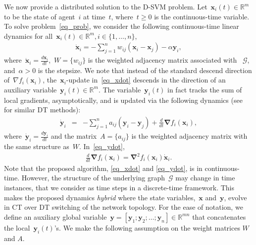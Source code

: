 \documentclass[letterpaper, 10pt, conference]{ieeeconf}
\def\mb{\mathbf}
\def\mbb{\mathbb}
\def\mc{\mathcal}
\begin{document}
We now provide a distributed solution to  the D-SVM problem. 
Let~$\mb{x}_i(t)\in\mathbb R^m$ to be the state of agent~$i$ at time~$t$, where~$t\geq 0$ is the continuous-time variable. To solve problem~\eqref{eq_prob}, we consider the following continuous-time linear dynamics for all~$\mb{x}_i(t) \in \mathbb{R}^{m},i\in\{1,\ldots,n\}$, 
\begin{eqnarray} \label{eq_xdot}	 
	\dot{\mb{x}}_i = -\sum_{j=1}^{n} w_{ij}(\mb{x}_i-\mb{x}_j)-\alpha \mb{y}_i, 
\end{eqnarray}
where~${\dot{\mb{x}}_i=\frac{d{\mb{x}}_i}{dt}}$,~${W=\{w_{ij}\}}$ is the weighted adjacency matrix associated with ~$\mc{G}$, and~$\alpha>0$ is the stepsize.  We note that instead of the standard descend direction of~$\nabla f_i(\mathbf{x}_i)$, the~$\mathbf{x}_i$-update in~\eqref{eq_xdot}
descends in the direction of an auxiliary variable~$\mb y_i(t)\in\mathbb{R}^m$. The variable~$\mb y_i(t)$ in fact tracks the sum of local gradients, asymptotically, and is updated via the following dynamics (see~\cite{xin2020decentralized,xin2020general,giannakis2020time} for similar DT methods):
\begin{eqnarray} \label{eq_ydot}	
	\dot{\mb{y}}_i &=& -\sum_{j=1}^{n} a_{ij}(\mb{y}_i-\mb{y}_j) + \frac{d}{d t} \boldsymbol{ \nabla} f_i(\mb{x}_i),
\end{eqnarray}
where~$\dot{\mb{y}}_i=\frac{d{\mb{y}}_i}{dt}$ and the matrix~$A=\{a_{ij}\}$ is the weighted adjacency matrix with the same structure as~$W$. In~\eqref{eq_ydot},
\begin{eqnarray} \label{eq_dtdf}	
	\frac{d}{d t} \boldsymbol{ \nabla} f_i(\mb{x}_i)=  \boldsymbol{ \nabla}^2 f_i(\mb{x}_i)  \dot{\mb{x}}_i.
\end{eqnarray} 
Note that the proposed algorithm, \eqref{eq_xdot} and \eqref{eq_ydot}, is in continuous-time. However, the structure of the underlying graph~$\mathcal G$ may change in time instances, that we consider as time steps in a discrete-time framework. This makes the proposed dynamics \textit{hybrid} where the state variables,~$\mathbf x$ and~$\mathbf y$, evolve in CT over DT switching of the network topology.
For the ease of notation, we define an auxiliary global variable~${\mb{y}=[\mb{y}_1;\mb{y}_2;\dots;\mb{y}_n]\in\mbb{R}^{mn}}$ that concatenates the local~$\mb{y}_i(t)$'s. %
We make the following assumption on the weight matrices $W$ and $A$.
\end{document}
